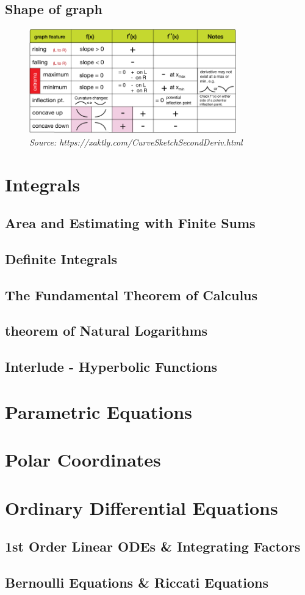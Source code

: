 \documentclass{article}
\begin{document}
\subsection{Shape of graph}
\begin{figure}[H]
    \centering
    \includegraphics[width=0.8\textwidth]{./img/graph.png}
    \caption*{\tiny\textit{\color{gray}Source: https://xaktly.com/CurveSketchSecondDeriv.html}}
\end{figure}

\section{Integrals}
\subsection{Area and Estimating with Finite Sums}
\subsection{Definite Integrals}
\subsection{The Fundamental Theorem of Calculus}
\subsection{theorem of Natural Logarithms}
\subsection{Interlude - Hyperbolic Functions}
\section{Parametric Equations}
\section{Polar Coordinates}
\section{Ordinary Differential Equations}
\subsection{1st Order Linear ODEs \& Integrating Factors}
\subsection{Bernoulli Equations \& Riccati Equations}
\end{document}
